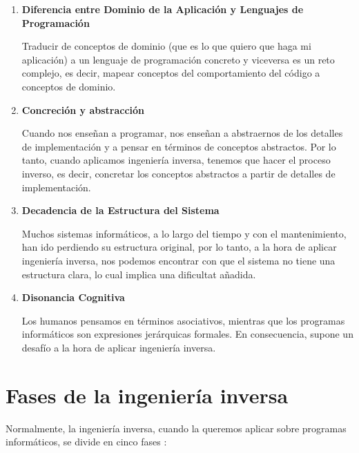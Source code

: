 \begin{enumerate}
    \item \textbf{Diferencia entre Dominio de la Aplicación y Lenguajes de Programación}
        
        Traducir de conceptos de dominio (que es lo que quiero que haga mi aplicación) a
        un lenguaje de programación concreto y viceversa es un reto complejo, es decir, mapear
        conceptos del comportamiento del código a conceptos de dominio.

    \item \textbf{Concreción y abstracción}
        
        Cuando nos enseñan a programar, nos enseñan a abstraernos de los detalles de implementación
        y a pensar en términos de conceptos abstractos. Por lo tanto, cuando aplicamos ingeniería
        inversa, tenemos que hacer el proceso inverso, es decir, concretar los conceptos abstractos
        a partir de detalles de implementación.

    \item \textbf{Decadencia de la Estructura del Sistema}
        
        Muchos sistemas informáticos, a lo largo del tiempo y con el mantenimiento, han ido perdiendo
        su estructura original, por lo tanto, a la hora de aplicar ingeniería inversa, nos podemos
        encontrar con que el sistema no tiene una estructura clara, lo cual implica una dificultat añadida.

    \item \textbf{Disonancia Cognitiva}
        
        Los humanos pensamos en términos asociativos, mientras que los programas informáticos son expresiones
        jerárquicas formales. En consecuencia, supone un desafío a la hora de aplicar ingeniería inversa.

\end{enumerate}

\section{Fases de la ingeniería inversa}
\label{sec:fases}


Normalmente, la ingeniería inversa, cuando la queremos aplicar sobre programas informáticos, se divide en
cinco fases \cite{FasesIngineriaInversa}:

